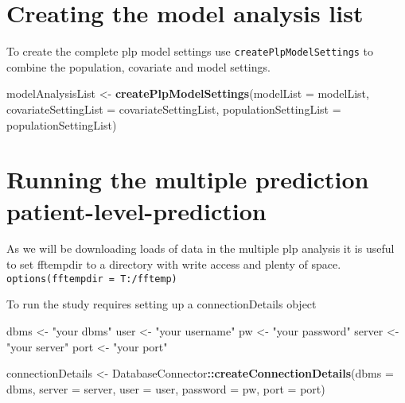 \documentclass[]{article}
\newenvironment{Shaded}{\begin{snugshade}}{\end{snugshade}}
\newcommand{\KeywordTok}[1]{\textcolor[rgb]{0.13,0.29,0.53}{\textbf{#1}}}
\newcommand{\DataTypeTok}[1]{\textcolor[rgb]{0.13,0.29,0.53}{#1}}
\newcommand{\StringTok}[1]{\textcolor[rgb]{0.31,0.60,0.02}{#1}}
\newcommand{\OperatorTok}[1]{\textcolor[rgb]{0.81,0.36,0.00}{\textbf{#1}}}
\newcommand{\NormalTok}[1]{#1}
\begin{document}
\section{Creating the model analysis
list}\label{creating-the-model-analysis-list}

To create the complete plp model settings use
\texttt{createPlpModelSettings} to combine the population, covariate and
model settings.

\begin{Shaded}
\begin{Highlighting}[]
\NormalTok{modelAnalysisList <-}\StringTok{ }\KeywordTok{createPlpModelSettings}\NormalTok{(}\DataTypeTok{modelList =}\NormalTok{ modelList, }
                                   \DataTypeTok{covariateSettingList =}\NormalTok{ covariateSettingList,}
                                   \DataTypeTok{populationSettingList =}\NormalTok{ populationSettingList)}
\end{Highlighting}
\end{Shaded}

\section{Running the multiple prediction
patient-level-prediction}\label{running-the-multiple-prediction-patient-level-prediction}

As we will be downloading loads of data in the multiple plp analysis it
is useful to set fftempdir to a directory with write access and plenty
of space.
\texttt{options(fftempdir\ =\ \textquotesingle{}T:/fftemp\textquotesingle{})}

To run the study requires setting up a connectionDetails object

\begin{Shaded}
\begin{Highlighting}[]
\NormalTok{dbms <-}\StringTok{ "your dbms"}
\NormalTok{user <-}\StringTok{ "your username"}
\NormalTok{pw <-}\StringTok{ "your password"}
\NormalTok{server <-}\StringTok{ "your server"}
\NormalTok{port <-}\StringTok{ "your port"}

\NormalTok{connectionDetails <-}\StringTok{ }\NormalTok{DatabaseConnector}\OperatorTok{::}\KeywordTok{createConnectionDetails}\NormalTok{(}\DataTypeTok{dbms =}\NormalTok{ dbms,}
                                                                \DataTypeTok{server =}\NormalTok{ server,}
                                                                \DataTypeTok{user =}\NormalTok{ user,}
                                                                \DataTypeTok{password =}\NormalTok{ pw,}
                                                                \DataTypeTok{port =}\NormalTok{ port)}
\end{Highlighting}
\end{Shaded}
\end{document}
